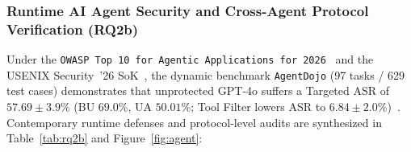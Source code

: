 \documentclass[10pt,twocolumn]{article}
\begin{document}
\subsubsection{Runtime AI Agent Security and Cross-Agent Protocol Verification (RQ2b)}
\label{sec:rq2b}

Under the \texttt{OWASP Top 10 for Agentic Applications for 2026}~\cite{owasp2025agentic} and the USENIX Security~'26 SoK~\cite{kim2026sok}, the dynamic benchmark \texttt{AgentDojo} (97 tasks / 629 test cases) demonstrates that unprotected GPT-4o suffers a Targeted ASR of \textbf{$57.69 \pm 3.9\%$} (BU $69.0\%$, UA $50.01\%$; Tool Filter lowers ASR to $6.84 \pm 2.0\%$)~\cite{debenedetti2024agentdojo}. Contemporary runtime defenses and protocol-level audits are synthesized in Table~\ref{tab:rq2b} and Figure~\ref{fig:agent}:
\end{document}
